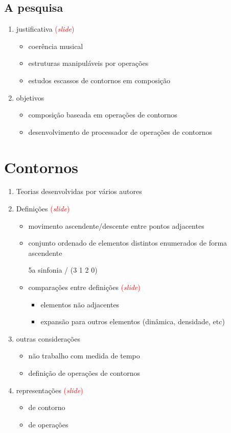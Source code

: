 \documentclass[12pt,a4paper]{article}
\newcommand{\slide}{\textcolor{red}{(\textit{slide})}}
\begin{document}
\subsection{A pesquisa}

\begin{enumerate}
\item justificativa \slide{}
  \begin{itemize}
  \item coerência musical
  \item estruturas manipuláveis por operações
  \item estudos escassos de contornos em composição
  \end{itemize}
\item objetivos
  \begin{itemize}
  \item composição baseada em operações de contornos
  \item desenvolvimento de processador de operações de contornos
  \end{itemize}
\end{enumerate}

\section{Contornos}

\begin{enumerate}
\item Teorias desenvolvidas por vários autores
\item Definições \slide{}
  \begin{itemize}
  \item movimento ascendente/descente entre pontos adjacentes 

  \item conjunto ordenado de elementos distintos enumerados de forma
    ascendente

    5a sinfonia / (3 1 2 0)
  \item comparações entre definições \slide{}
    \begin{itemize}
    \item elementos não adjacentes
    \item expansão para outros elementos (dinâmica, densidade, etc)
    \end{itemize}
  \end{itemize}
\item outras considerações
  \begin{itemize}
  \item não trabalho com medida de tempo
  \item definição de operações de contornos
  \end{itemize}
\item representações \slide{}
  \begin{itemize}
  \item de contorno
  \item de operações
  \end{itemize}
\end{enumerate}
\end{document}
